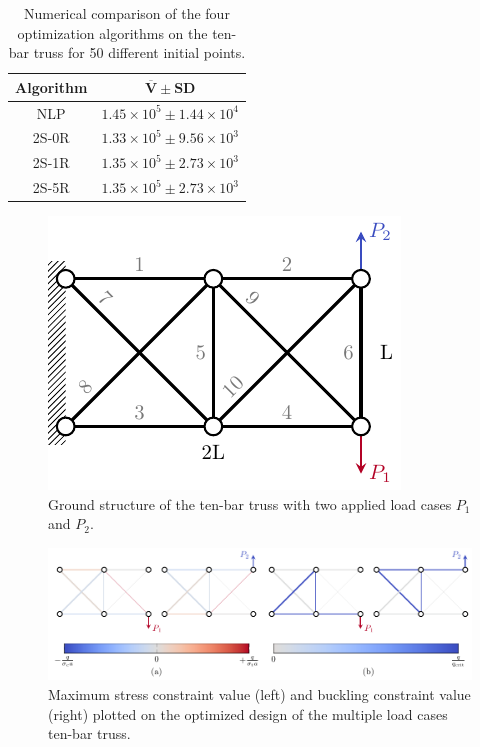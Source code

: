 \begin{table}
    \small
\centering
\begin{tabular}{cc}
\toprule
\textbf{Algorithm} &
  \multicolumn{1}{c}{$\bm{\overline{V}} \pm \textbf{SD}$}\\ \midrule
NLP & $1.45\times 10^5\pm1.44\times 10^4 $ \\
2S-0R & $1.33\times 10^5\pm9.56\times 10^3 $ \\
2S-1R & $1.35\times 10^5\pm2.73\times 10^3 $ \\
2S-5R & $1.35\times 10^5\pm2.73\times 10^3 $ \\
\bottomrule
\end{tabular}
\caption{Numerical comparison of the four optimization algorithms on the ten-bar truss for 50 different initial points.}
\label{tab:04_10_bar_multi_solution}
\end{table}

\begin{figure}
    \centering
    \includegraphics{figures/04_TTO_improvements/18_10_bar_multi_BC/10_bar_BC_multi.pdf}
    \caption{Ground structure of the ten-bar truss with two applied load cases $P_1$ and $P_2$.}
    \label{fig:04_10-bar-bcs-multi}
\end{figure}

\begin{figure}
    \centering
    \includegraphics[width=\linewidth]{figures/04_TTO_improvements/19_10_bar_multi_opt/10_bar_multi_opt.pdf}
     \caption{Maximum stress constraint value (left) and buckling constraint value (right) plotted on the optimized design of the multiple load cases ten-bar truss.}
    \label{fig:04_10-bar-bcs-multi-opt}
\end{figure}

